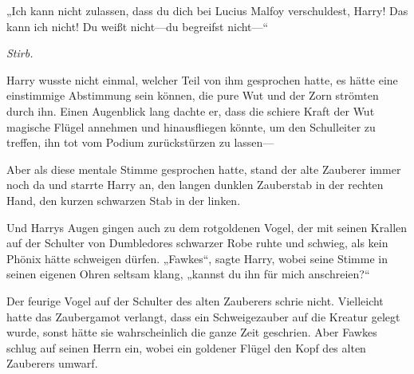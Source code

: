 „Ich kann nicht zulassen, dass du dich bei Lucius Malfoy verschuldest, Harry! Das kann ich nicht! Du weißt nicht—du begreifst nicht—“

\emph{Stirb.}

Harry wusste nicht einmal, welcher Teil von ihm gesprochen hatte, es hätte eine einstimmige Abstimmung sein können, die pure Wut und der Zorn strömten durch ihn. Einen Augenblick lang dachte er, dass die schiere Kraft der Wut magische Flügel annehmen und hinausfliegen könnte, um den Schulleiter zu treffen, ihn tot vom Podium zurückstürzen zu lassen—

Aber als diese mentale Stimme gesprochen hatte, stand der alte Zauberer immer noch da und starrte Harry an, den langen dunklen Zauberstab in der rechten Hand, den kurzen schwarzen Stab in der linken.

Und Harrys Augen gingen auch zu dem rotgoldenen Vogel, der mit seinen Krallen auf der Schulter von Dumbledores schwarzer Robe ruhte und schwieg, als kein Phönix hätte schweigen dürfen.
„Fawkes“, sagte Harry, wobei seine Stimme in seinen eigenen Ohren seltsam klang, „kannst du ihn für mich anschreien?“

Der feurige Vogel auf der Schulter des alten Zauberers schrie nicht. Vielleicht hatte das Zaubergamot verlangt, dass ein Schweigezauber auf die Kreatur gelegt wurde, sonst hätte sie wahrscheinlich die ganze Zeit geschrien. Aber Fawkes schlug auf seinen Herrn ein, wobei ein goldener Flügel den Kopf des alten Zauberers umwarf.

